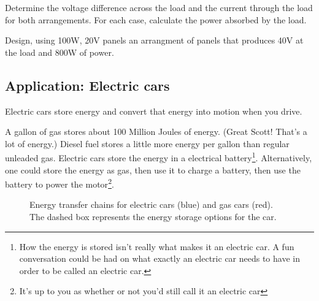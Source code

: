 \begin{blevel}
Determine the voltage difference across the load and the current through the load for both arrangements. For each case, calculate the power absorbed by the load.
\end{blevel}

\begin{clevel}
Design, using 100W, 20V panels an arrangment of panels that produces 40V at the load and 800W of power.
\end{clevel}

\subsection{Application: Electric cars}
Electric cars store energy and convert that energy into motion when you drive.\par

A gallon of gas stores about 100 Million Joules of energy. (Great Scott! That's a lot of energy.) Diesel fuel stores a little more energy per gallon than regular unleaded gas. Electric cars store the energy in a electrical battery\footnote{How the energy is stored isn't really what makes it an electric car. A fun conversation could be had on what exactly an electric car needs to have in order to be called an electric car.}. Alternatively, one could store the energy as gas, then use it to charge a battery, then use the battery to power the motor\footnote{It's up to you as whether or not you'd still call it an electric car}.

\begin{figure}[H]
\begin{center}
\caption{Energy transfer chains for electric cars (blue) and gas cars (red). The dashed box represents the energy storage options for the car.}
\end{center}
\end{figure}

